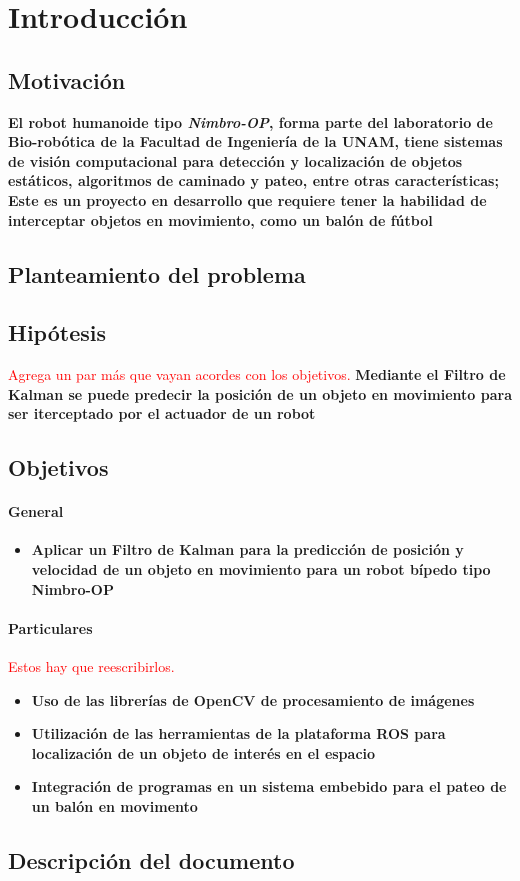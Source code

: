 \chapter{Introducción}

\section{Motivación}
	\textbf{El robot humanoide tipo \textit{Nimbro-OP}, forma parte del laboratorio de Bio-robótica de la Facultad de Ingeniería de la UNAM, tiene sistemas de visión computacional para detección y localización de objetos estáticos, algoritmos de caminado y pateo, entre otras características; Este es un proyecto en desarrollo que requiere tener la habilidad de interceptar objetos en movimiento, como un balón de fútbol}
\section{Planteamiento del problema}
\section{Hipótesis}
\textcolor{red}{Agrega un par más que vayan acordes con los objetivos.}
		\textbf{Mediante el Filtro de Kalman se puede predecir la posición de un objeto en movimiento para ser iterceptado por el actuador de un robot}
\section{Objetivos}
	\subsubsection{General}
		\begin{itemize}
			\item \textbf{Aplicar un Filtro de Kalman para la predicción de posición y velocidad de un objeto en movimiento para un robot bípedo tipo Nimbro-OP}
		\end{itemize}
	\subsubsection{Particulares}
	\textcolor{red}{Estos hay que reescribirlos.}
		\begin{itemize}
			\item \textbf{Uso de las librerías de OpenCV de procesamiento de imágenes}
			\item \textbf{Utilización de las herramientas de la plataforma ROS para localización de un objeto de interés en el espacio}
			\item \textbf{Integración de programas en un sistema embebido para el pateo de un balón en movimento}
		\end{itemize}		
\section{Descripción del documento}